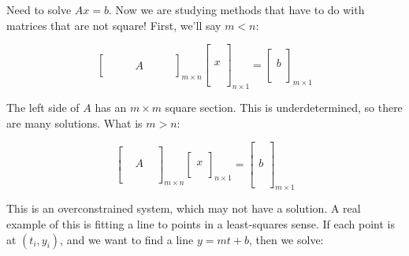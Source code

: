Need to solve $Ax = b$. Now we are studying methods that have to do with matrices that are not square! First, we'll say $m < n$:

\[
	\begin{bmatrix}
		& & & & & & \\
		& & & A & & & \\
		& & & & & &
	\end{bmatrix}_{m \times n}
	\begin{bmatrix}
		\\ \\ \\ x \\ \\ \\ \\
	\end{bmatrix}_{n \times 1} =
	\begin{bmatrix}
		\\ b \\ \\
	\end{bmatrix}_{m \times 1}
\]

The left side of $A$ has an $m \times m$ square section. This is underdetermined, so there are many solutions. What is $m > n$:

\[
	\begin{bmatrix}
		\\
		 \\
		& A &\\
		\\
		\\
	\end{bmatrix}_{m \times n}
	\begin{bmatrix}
		\\ x \\ \\
	\end{bmatrix}_{n \times 1} =
	\begin{bmatrix}
		\\ \\ \\ b \\ \\ \\ \\
	\end{bmatrix}_{m \times 1}
\]

This is an overconstrained system, which may not have a solution. A real example of this is fitting a line to points in a least-squares sense. If each point is at $(t_i, y_i)$, and we want to find a line $y = mt + b$, then we solve:

